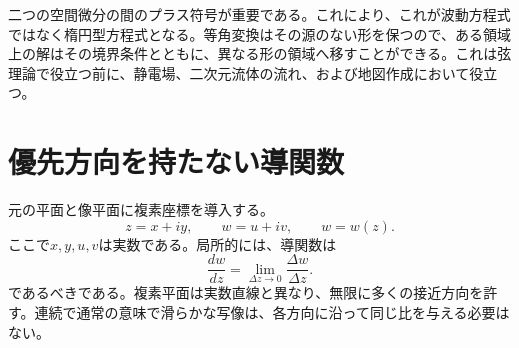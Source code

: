 二つの空間微分の間のプラス符号が重要である。これにより、これが波動方程式ではなく楕円型方程式となる。等角変換はその源のない形を保つので、ある領域上の解はその境界条件とともに、異なる形の領域へ移すことができる。これは弦理論で役立つ前に、静電場、二次元流体の流れ、および地図作成において役立つ。

\begin{classroomqa}
\end{classroomqa}

\begin{classroomqa}
\end{classroomqa}

\section{優先方向を持たない導関数}

元の平面と像平面に複素座標を導入する。
\begin{equation}
  z=x+iy,
  \qquad
  w=u+iv,
  \qquad
  w=w(z).
  \label{eq:l08-complex-coordinates}
\end{equation}
ここで\(x,y,u,v\)は実数である。局所的には、導関数は
\begin{equation}
  \frac{dw}{dz}
  =\lim_{\Delta z\to0}\frac{\Delta w}{\Delta z}.
  \label{eq:l08-complex-derivative}
\end{equation}
であるべきである。複素平面は実数直線と異なり、無限に多くの接近方向を許す。連続で通常の意味で滑らかな写像は、各方向に沿って同じ比を与える必要はない。

